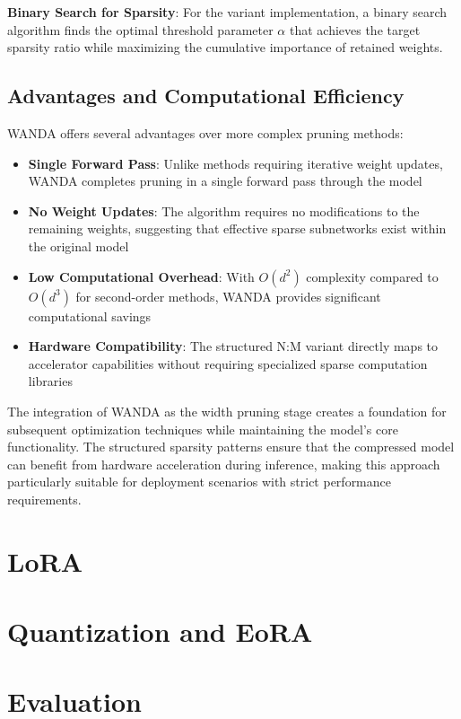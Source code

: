 \textbf{Binary Search for Sparsity}: For the variant implementation, a binary search algorithm finds the optimal threshold parameter $\alpha$ that achieves the target sparsity ratio while maximizing the cumulative importance of retained weights.

\subsection{Advantages and Computational Efficiency}

WANDA offers several advantages over more complex pruning methods:

\begin{itemize}
   \item \textbf{Single Forward Pass}: Unlike methods requiring iterative weight updates, WANDA completes pruning in a single forward pass through the model
   \item \textbf{No Weight Updates}: The algorithm requires no modifications to the remaining weights, suggesting that effective sparse subnetworks exist within the original model
   \item \textbf{Low Computational Overhead}: With $O(d^2)$ complexity compared to $O(d^3)$ for second-order methods, WANDA provides significant computational savings
   \item \textbf{Hardware Compatibility}: The structured N:M variant directly maps to accelerator capabilities without requiring specialized sparse computation libraries
\end{itemize}

The integration of WANDA as the width pruning stage creates a foundation for subsequent optimization techniques while maintaining the model's core functionality. The structured sparsity patterns ensure that the compressed model can benefit from hardware acceleration during inference, making this approach particularly suitable for deployment scenarios with strict performance requirements.
\section{LoRA} \label{lora}
\section{Quantization and EoRA} \label{quantization}
\section{Evaluation}